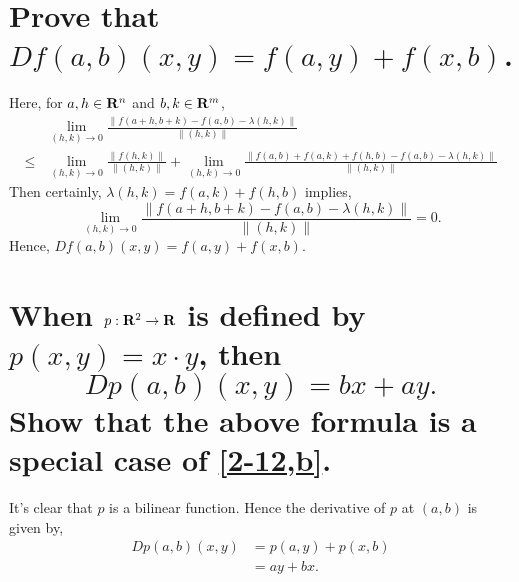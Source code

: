 \begin{parts}
    \part{
        \label{2-12,b}
        Prove that $Df(a,b)(x,y)=
        f(a,y)+f(x,b)$.
    }
    \begin{solution}
        Here, for $a,h\in\mathbf{R}^n$ and $b,k\in\mathbf{R}^m$,
        \begin{align*}
            &\lim_{(h,k)\to 0}{
                \frac{\|f(a+h,b+k)
                -f(a,b)-\lambda(h,k)\|}{
                \|(h,k)\|}
            }\\
            \le &\lim_{(h,k)\to 0}{
                \frac{\|f(h,k)\|}{\|(h,k)\|}
            }+\lim_{(h,k)\to 0}{
                \frac{\|f(a,b)+f(a,k)+f(h,b)
                -f(a,b)-\lambda(h,k)\|}
                {\|(h,k)\|}
            }
        \end{align*}Then certainly,
        $\lambda(h,k)=f(a,k)+f(h,b)$
        implies,
        $$\lim_{(h,k)\to 0}{
            \frac{\|f(a+h,b+k)
            -f(a,b)-\lambda(h,k)\|}{
            \|(h,k)\|}
        }=0.$$
        Hence, $Df(a,b)(x,y)=f(a,y)+f(x,b).$
    \end{solution}
    \part{
        When $p:\mathbf{R}^2\to\mathbf{R}$ is defined by 
        $p(x,y)=x\cdot y$, then
        $$Dp(a,b)(x,y)=bx+ay.$$
        Show that the above formula is a
        special case of \ref{2-12,b}.
    }
    \begin{solution}
        It's clear that $p$ is a bilinear
        function. Hence the derivative of $p$
        at $(a,b)$ is given by,
        \begin{align*} 
            Dp(a,b)(x,y)&=p(a,y)+p(x,b)\\
            &=ay+bx.
        \end{align*}
    \end{solution}
\end{parts}